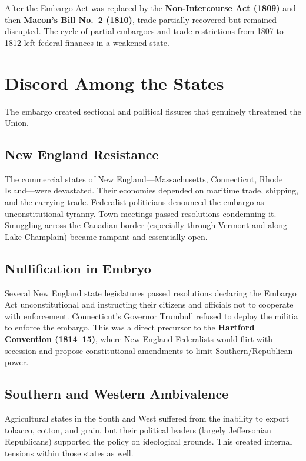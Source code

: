 \documentclass[12pt]{article}
\begin{document}
After the Embargo Act was replaced by the \textbf{Non-Intercourse Act (1809)}
and then \textbf{Macon's Bill No.~2 (1810)}, trade partially recovered but
remained disrupted. The cycle of partial embargoes and trade restrictions from
1807 to 1812 left federal finances in a weakened state.

\section{Discord Among the States}

The embargo created sectional and political fissures that genuinely threatened
the Union.

\subsection{New England Resistance}

The commercial states of New England---Massachusetts, Connecticut, Rhode
Island---were devastated. Their economies depended on maritime trade, shipping,
and the carrying trade. Federalist politicians denounced the embargo as
unconstitutional tyranny. Town meetings passed resolutions condemning it.
Smuggling across the Canadian border (especially through Vermont and along Lake
Champlain) became rampant and essentially open.

\subsection{Nullification in Embryo}

Several New England state legislatures passed resolutions declaring the Embargo
Act unconstitutional and instructing their citizens and officials not to
cooperate with enforcement. Connecticut's Governor Trumbull refused to deploy the
militia to enforce the embargo. This was a direct precursor to the
\textbf{Hartford Convention (1814--15)}, where New England Federalists would
flirt with secession and propose constitutional amendments to limit
Southern/Republican power.

\subsection{Southern and Western Ambivalence}

Agricultural states in the South and West suffered from the inability to export
tobacco, cotton, and grain, but their political leaders (largely Jeffersonian
Republicans) supported the policy on ideological grounds. This created internal
tensions within those states as well.
\end{document}
